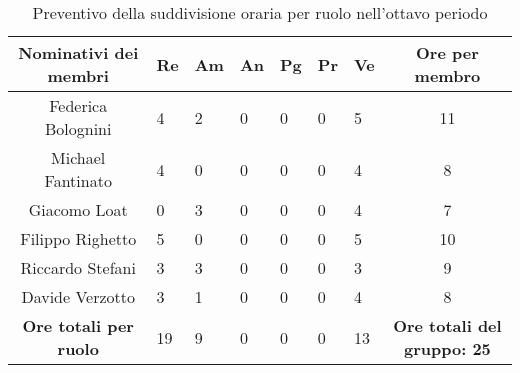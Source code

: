 \begin{table}[h!]
    \centering
    \renewcommand{\arraystretch}{1.5}
    \begin{tabularx}{\textwidth}{|c|X|X|X|X|X|X|c|}\hline
    \rowcolor[HTML]{FFD700} 
    \textbf{Nominativi dei membri} & \textbf{Re} & \textbf{Am} & \textbf{An} & \textbf{Pg} & \textbf{Pr} & \textbf{Ve} & \textbf{Ore per membro} \\ \hline
    Federica Bolognini  & 4 & 2 & 0 & 0 & 0 & 5 & 11 \\ \hline
    Michael Fantinato   & 4 & 0 & 0 & 0 & 0 & 4 & 8 \\ \hline
    Giacomo Loat        & 0 & 3 & 0 & 0 & 0 & 4 & 7 \\ \hline
    Filippo Righetto    & 5 & 0 & 0 & 0 & 0 & 5 & 10 \\ \hline
    Riccardo Stefani    & 3 & 3 & 0 & 0 & 0 & 3 & 9 \\ \hline
    Davide Verzotto     & 3 & 1 & 0 & 0 & 0 & 4 & 8 \\ \hline
    \rowcolor[HTML]{FFD700} 
    \textbf{Ore totali per ruolo} & 19 & 9 & 0 & 0 & 0 & 13 & \textbf{Ore totali del gruppo: 25} \\ \hline
    \end{tabularx}
    \caption{Preventivo della suddivisione oraria per ruolo nell'ottavo periodo}
\end{table}

